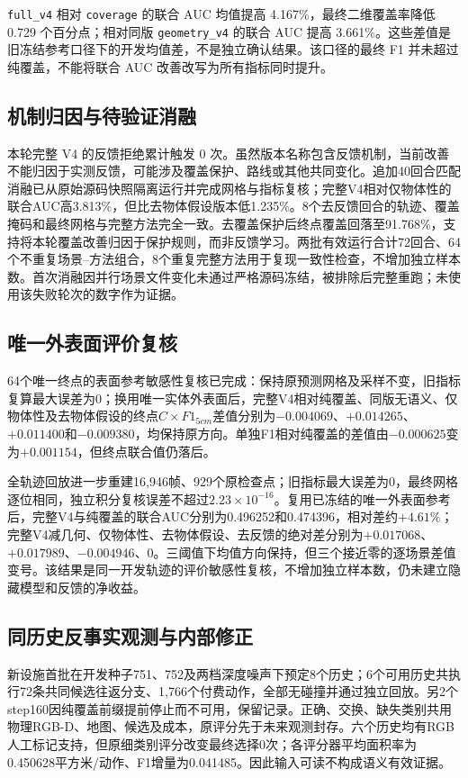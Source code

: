 \documentclass[11pt,a4paper]{article}
\begin{document}
\texttt{full\_v4} 相对 \texttt{coverage} 的联合 AUC 均值提高 4.167\%，最终二维覆盖率降低 0.729 个百分点；相对同版 \texttt{geometry\_v4} 的联合 AUC 提高 3.661\%。这些差值是旧冻结参考口径下的开发均值差，不是独立确认结果。该口径的最终 F1 并未超过纯覆盖，不能将联合 AUC 改善改写为所有指标同时提升。

\subsection{机制归因与待验证消融}
本轮完整 V4 的反馈拒绝累计触发 0 次。虽然版本名称包含反馈机制，当前改善不能归因于实测反馈，可能涉及覆盖保护、路线或其他共同变化。追加40回合匹配消融已从原始源码快照隔离运行并完成网格与指标复核；完整V4相对仅物体性的联合AUC高3.813\%，但比去物体假设版本低1.235\%。8个去反馈回合的轨迹、覆盖掩码和最终网格与完整方法完全一致。去覆盖保护后终点覆盖回落至91.768\%，支持将本轮覆盖改善归因于保护规则，而非反馈学习。两批有效运行合计72回合、64个不重复场景--方法组合，8个重复完整方法用于复现一致性检查，不增加独立样本数。首次消融因并行场景文件变化未通过严格源码冻结，被排除后完整重跑；未使用该失败轮次的数字作为证据。

\subsection{唯一外表面评价复核}
64个唯一终点的表面参考敏感性复核已完成：保持原预测网格及采样不变，旧指标复算最大误差为0；换用唯一实体外表面后，完整V4相对纯覆盖、同版无语义、仅物体性及去物体假设的终点$C\times F1_{5cm}$差值分别为$-0.004069$、$+0.014265$、$+0.011400$和$-0.009380$，均保持原方向。单独F1相对纯覆盖的差值由$-0.000625$变为$+0.001154$，但终点联合值仍落后。

全轨迹回放进一步重建16,946帧、929个原检查点；旧指标最大误差为0，最终网格逐位相同，独立积分复核误差不超过$2.23\times10^{-16}$。复用已冻结的唯一外表面参考后，完整V4与纯覆盖的联合AUC分别为0.496252和0.474396，相对差约$+4.61\%$；完整V4减几何、仅物体性、去物体假设、去反馈的绝对差分别为$+0.017068$、$+0.017989$、$-0.004946$、0。三阈值下均值方向保持，但三个接近零的逐场景差值变号。该结果是同一开发轨迹的评价敏感性复核，不增加独立样本数，仍未建立隐藏模型和反馈的净收益。

\subsection{同历史反事实观测与内部修正}
新设施首批在开发种子751、752及两档深度噪声下预定8个历史；6个可用历史共执行72条共同候选往返分支、1,766个付费动作，全部无碰撞并通过独立回放。另2个step160因纯覆盖前缀提前停止而不可用，保留记录。正确、交换、缺失类别共用物理RGB-D、地图、候选及成本，原评分先于未来观测封存。六个历史均有RGB人工标记支持，但原细类别评分改变最终选择0次；各评分器平均面积率为0.450628平方米/动作、F1增量为0.041485。因此输入可读不构成语义有效证据。
\end{document}

